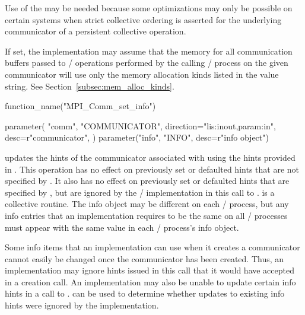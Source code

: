 \begin{description}
\begin{users}
Use of the  may
be needed because some optimizations may only be possible on certain
systems when strict collective ordering is asserted for the
underlying communicator of a persistent collective operation.
\end{users}

\item[\infokey{mpi\_assert\_memory\_alloc\_kinds} (string, not set by default):]
If set, the implementation may assume that the memory for all
communication buffers passed to \MPI/ operations performed by the calling \MPI/
process on the given communicator will use only the memory allocation kinds
listed in the value string. See Section~\ref{subsec:mem_alloc_kinds}.

\end{description}

%
\begin{mpi-binding}
    function_name("MPI_Comm_set_info")
    
    parameter(
        "comm",
        "COMMUNICATOR",
        direction="lis:inout,param:in",
        desc=r"communicator",
    )
    parameter("info", "INFO", desc=r"info object")
\end{mpi-binding}

 updates the hints of the communicator
associated with  using the hints provided in .
This operation has no effect on previously set or defaulted hints that
are not specified by . It also has no effect on previously
set or defaulted hints that are specified by , but are
ignored by the \MPI/ implementation in this call to
.
 is a collective
routine. The info object may be different on each \MPI/ process, but any
info entries that an implementation requires to be the same on all
\MPI/ processes must appear with the same value in each \MPI/ process's info
object.

\begin{users}
Some info items that an implementation can use when it creates a
communicator cannot easily be changed once the communicator has been
created. Thus, an implementation may ignore hints issued in this call
that it would have accepted in a creation call.
An implementation may also be unable to update certain info hints in a call to .
 can be used to determine whether updates
to existing info hints were ignored by the implementation.
\end{users}

